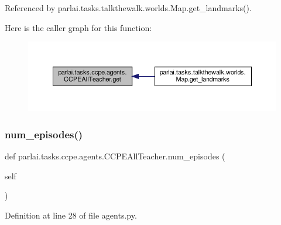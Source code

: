 Referenced by parlai.\+tasks.\+talkthewalk.\+worlds.\+Map.\+get\+\_\+landmarks().

Here is the caller graph for this function\+:
\nopagebreak
\begin{figure}[H]
\begin{center}
\leavevmode
\includegraphics[width=350pt]{classparlai_1_1tasks_1_1ccpe_1_1agents_1_1CCPEAllTeacher_aca16523f7aa61db6fc1c3fa561334521_icgraph}
\end{center}
\end{figure}
\mbox{\label{classparlai_1_1tasks_1_1ccpe_1_1agents_1_1CCPEAllTeacher_a0f9ed996020d75cb7e204f72465f46d6}} 
\subsubsection{\texorpdfstring{num\+\_\+episodes()}{num\_episodes()}}
{\footnotesize\ttfamily def parlai.\+tasks.\+ccpe.\+agents.\+C\+C\+P\+E\+All\+Teacher.\+num\+\_\+episodes (\begin{DoxyParamCaption}\item[{}]{self }\end{DoxyParamCaption})}



Definition at line 28 of file agents.\+py.



